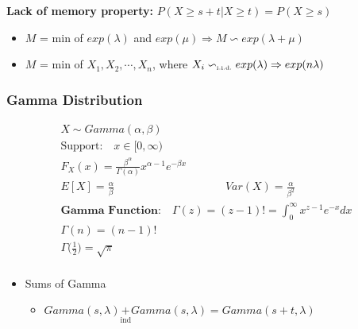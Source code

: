 \textbf{Lack of memory property:} $P(X \geq s+t | X\geq t) = P(X \geq s)$
\begin{itemize}
	\item $M$ = min of $exp(\lambda)$ and $exp(\mu) \Rightarrow M \backsim exp(\lambda + \mu)$
	\item $M$ = min of $X_1, X_2, \cdots, X_n$, where $X_i \backsim_{\text{\tiny i.i.d.}} exp(\lambda) \Rightarrow exp(n\lambda)$ 
\end{itemize}
\subsubsection*{Gamma Distribution}
\begin{tcolorbox}
	\begin{gather*}
		X \sim Gamma(\alpha, \beta)\\
		\text{Support:} \quad x \in [0, \infty)\\
		F_X(x) = \frac{\beta^\alpha}{\Gamma(\alpha)} x^{\alpha - 1} e^{-\beta x}\\
		E[X] = \frac{\alpha}{\beta} \hspace{10em} Var(X) = \frac{\alpha}{\beta^2}\\
		\textbf{Gamma Function:} \quad \Gamma(z) = (z - 1)! = \int_0^\infty x^{z-1} e^{-x} dx\\
		\Gamma(n) = (n-1)!\\
		\Gamma\bigg(\frac{1}{2}\bigg) = \sqrt{\pi}\\
	\end{gather*}
\end{tcolorbox}
\begin{itemize}
	\item Sums of Gamma
		\begin{itemize}[label={--}]
		\item $Gamma(s, \lambda) \underset{\text{ind}}{+} Gamma(s, \lambda) = Gamma(s+t, \lambda)$ 
		\end{itemize}
\end{itemize}
